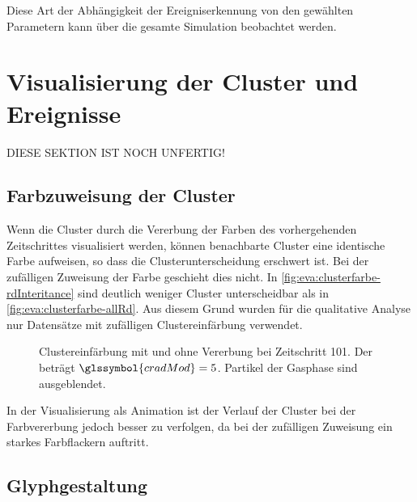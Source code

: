 Diese Art der Abhängigkeit der Ereigniserkennung von den gewählten Parametern kann über die gesamte Simulation beobachtet werden.

\section{Visualisierung der Cluster und Ereignisse}

DIESE SEKTION IST NOCH UNFERTIG!

\subsection*{Farbzuweisung der Cluster}
Wenn die Cluster durch die Vererbung der Farben des vorhergehenden Zeitschrittes visualisiert werden, können benachbarte Cluster eine identische Farbe aufweisen, so dass die Clusterunterscheidung erschwert ist. Bei der zufälligen Zuweisung der Farbe geschieht dies nicht. In \autoref{fig:eva:clusterfarbe-rdInteritance} sind deutlich weniger Cluster unterscheidbar als in \autoref{fig:eva:clusterfarbe-allRd}. Aus diesem Grund wurden für die qualitative Analyse nur Datensätze mit zufälligen Clustereinfärbung verwendet.

\begin{figure}
	{\caption{Clustereinfärbung mit und ohne Vererbung bei Zeitschritt 101. Der  beträgt $\glssymbol{cradMod} = 5$. Partikel der Gasphase sind ausgeblendet.}\label{fig:eva:clusterfarbe}}
\end{figure}

In der Visualisierung als Animation ist der Verlauf der Cluster bei der Farbvererbung jedoch besser zu verfolgen, da bei der zufälligen Zuweisung ein starkes Farbflackern auftritt.


\subsection*{Glyphgestaltung}

